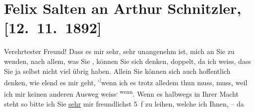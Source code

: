 

         
         \renewcommand{\erwaehntePersonen}{Personen: Julius Bauer, Paul Horn, Felix Salten}
         \renewcommand{\erwaehnteOrte}{Orte: Café Pfob, Café Union, Riedhof, Volkstheater, Wien}
         \renewcommand{\erwaehnteWerke}{Werke: ?? [Feuilleton], Musotte, Tagebuch}
               \section[Felix Salten an Arthur Schnitzler, {[}12. 11. 1892{]}]{ Felix Salten an Arthur Schnitzler, {[}12. 11. 1892{]}}\nopagebreak{}\rehead{ }\begin{ledgroupsized}[t]{13cm}\normalsize\beginnumbering{} \toendnotes[C]{\smallbreak\pagebreak[2]} 
\toendnotes[C]{\smallbreak}\pstart
           \noindent{}{\pb}Verehrtester Freund! Dass es mir sehr, sehr unangenehm
               ist, mich an Sie zu wenden, nach allem, was Sie \label{K_L03117-1v}\label{K_L03117-1h}, können Sie sich denken, doppelt, da ich weiss, dass Sie ja selbst nicht viel
               übrig haben. Allein Sie können sich auch hoffentlich denken, wie elend es mir geht, \substVorne{}\textsuperscript{\textcolor{gray}{d}}\substDazwischen{}w\substHinten{}enn ich es trotz alledem thun muss, muss, weil ich mir keinen anderen Ausweg weiss\substVorne{}\textsuperscript{, wenn}{\allowbreak}\substDazwischen{}. Wenn\substHinten{} es halbwegs in Ihrer Macht steht so bitte ich Sie \uline{sehr} mir freundlichst 5 f zu leihen, welche ich {\pb}Ihnen, – da \label{K_L03117-2v}
\end{ledgroupsized}
